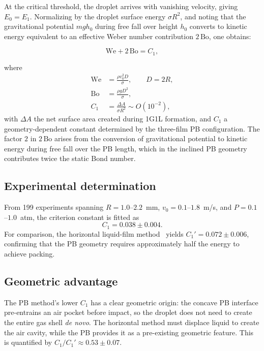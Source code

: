 \documentclass[%
 preprint,
 superscriptaddress,
 amsmath,amssymb,
 aps, prl,
]{revtex4-2}
\begin{document}
At the critical threshold, the droplet arrives with vanishing velocity, giving
$E_0 = E_1$.  Normalizing by the droplet surface energy $\sigma R^2$, and noting that
the gravitational potential $m g h_0$ during free fall over height $h_0$ converts to
kinetic energy equivalent to an effective Weber number contribution $2\,\text{Bo}$,
one obtains:

\begin{equation}
\boxed{\text{We} + 2\,\text{Bo} = C_1},
\end{equation}

where
\begin{align}
\text{We} &= \frac{\rho v_0^2 D}{\sigma}, \qquad
D = 2R, \\
\text{Bo}  &= \frac{\rho g D^2}{\sigma}, \\
C_1 &= \frac{\Delta A}{\sigma R^2} \sim O(10^{-2}),
\end{align}
with $\Delta A$ the net surface area created during 1G1L formation, and $C_1$ a
geometry-dependent constant determined by the three-film PB configuration.
The factor $2$ in $2\,\text{Bo}$ arises from the conversion of gravitational
potential to kinetic energy during free fall over the PB length, which in the
inclined PB geometry contributes twice the static Bond number.

\subsection{Experimental determination}

From 199 experiments spanning $R = 1.0$--$2.2$~mm, $v_0 = 0.1$--$1.8$~m/s,
and $P = 0.1$--$1.0$~atm, the criterion constant is fitted as
\begin{equation}
C_1 = 0.038 \pm 0.004.
\end{equation}
For comparison, the horizontal liquid-film method~\cite{Bai2016} yields
$C_1' = 0.072 \pm 0.006$, confirming that the PB geometry requires
approximately half the energy to achieve packing.

\subsection{Geometric advantage}

The PB method's lower $C_1$ has a clear geometric origin:
the concave PB interface pre-entrains an air pocket before impact,
so the droplet does not need to create the entire gas shell \emph{de novo}.
The horizontal method must displace liquid to create the air cavity,
while the PB provides it as a pre-existing geometric feature.
This is quantified by $C_1/C_1' \approx 0.53 \pm 0.07$.
\end{document}
